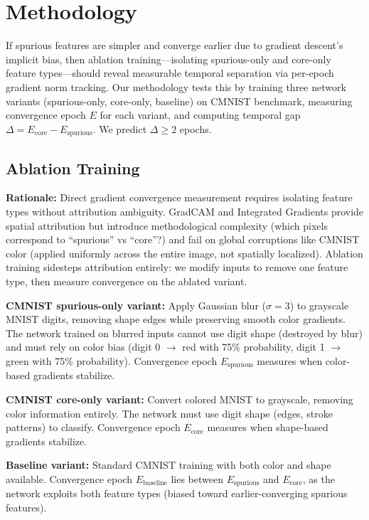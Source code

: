 \section{Methodology}
\label{sec:methodology}

If spurious features are simpler and converge earlier due to gradient descent's implicit bias, then ablation training---isolating spurious-only and core-only feature types---should reveal measurable temporal separation via per-epoch gradient norm tracking. Our methodology tests this by training three network variants (spurious-only, core-only, baseline) on CMNIST benchmark, measuring convergence epoch $E$ for each variant, and computing temporal gap $\Delta = E_{\text{core}} - E_{\text{spurious}}$. We predict $\Delta \geq 2$ epochs.

\subsection{Ablation Training}

\textbf{Rationale:} Direct gradient convergence measurement requires isolating feature types without attribution ambiguity. GradCAM and Integrated Gradients provide spatial attribution but introduce methodological complexity (which pixels correspond to ``spurious'' vs ``core''?) and fail on global corruptions like CMNIST color (applied uniformly across the entire image, not spatially localized). Ablation training sidesteps attribution entirely: we modify inputs to remove one feature type, then measure convergence on the ablated variant.

\textbf{CMNIST spurious-only variant:} Apply Gaussian blur ($\sigma=3$) to grayscale MNIST digits, removing shape edges while preserving smooth color gradients. The network trained on blurred inputs cannot use digit shape (destroyed by blur) and must rely on color bias (digit 0 $\rightarrow$ red with 75\% probability, digit 1 $\rightarrow$ green with 75\% probability). Convergence epoch $E_{\text{spurious}}$ measures when color-based gradients stabilize.

\textbf{CMNIST core-only variant:} Convert colored MNIST to grayscale, removing color information entirely. The network must use digit shape (edges, stroke patterns) to classify. Convergence epoch $E_{\text{core}}$ measures when shape-based gradients stabilize.

\textbf{Baseline variant:} Standard CMNIST training with both color and shape available. Convergence epoch $E_{\text{baseline}}$ lies between $E_{\text{spurious}}$ and $E_{\text{core}}$, as the network exploits both feature types (biased toward earlier-converging spurious features).

